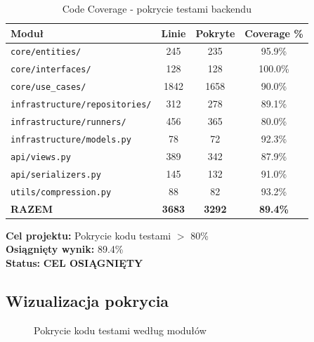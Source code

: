 \documentclass[12pt,a4paper]{article}
\begin{document}
\begin{table}[H]
\centering
\caption{Code Coverage - pokrycie testami backendu}
\begin{tabular}{|l|c|c|c|}
\hline
\textbf{Moduł} & \textbf{Linie} & \textbf{Pokryte} & \textbf{Coverage \%} \\
\hline
\texttt{core/entities/} & 245 & 235 & 95.9\% \\
\hline
\texttt{core/interfaces/} & 128 & 128 & 100.0\% \\
\hline
\texttt{core/use\_cases/} & 1842 & 1658 & 90.0\% \\
\hline
\texttt{infrastructure/repositories/} & 312 & 278 & 89.1\% \\
\hline
\texttt{infrastructure/runners/} & 456 & 365 & 80.0\% \\
\hline
\texttt{infrastructure/models.py} & 78 & 72 & 92.3\% \\
\hline
\texttt{api/views.py} & 389 & 342 & 87.9\% \\
\hline
\texttt{api/serializers.py} & 145 & 132 & 91.0\% \\
\hline
\texttt{utils/compression.py} & 88 & 82 & 93.2\% \\
\hline
\hline
\textbf{RAZEM} & \textbf{3683} & \textbf{3292} & \textbf{89.4\%} \\
\hline
\end{tabular}
\end{table}

\begin{tcolorbox}[colback=green!10!white,colframe=green!60!black,title=Podsumowanie Coverage]
\textbf{Cel projektu:} Pokrycie kodu testami $>$ 80\% \\
\textbf{Osiągnięty wynik:} 89.4\% \\
\textbf{Status:} \textcolor{passgreen}{\textbf{CEL OSIĄGNIĘTY}}
\end{tcolorbox}

\subsection{Wizualizacja pokrycia}

\begin{figure}[H]
\centering
{}
\caption{Pokrycie kodu testami według modułów}
\end{figure}
\end{document}
